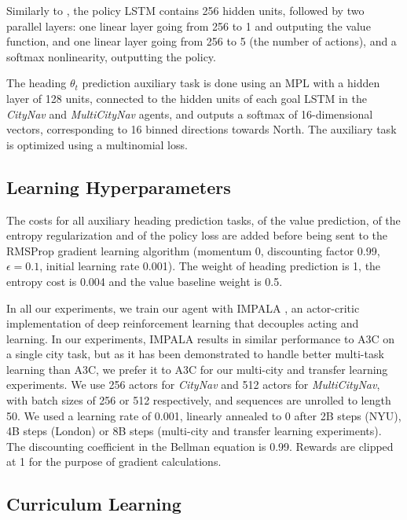 Similarly to \cite{mnih2016asynchronous}, the policy LSTM contains 256 hidden units, followed by two parallel layers: one linear layer going from 256 to 1 and outputing the value function, and one linear layer going from 256 to 5 (the number of actions), and a softmax nonlinearity, outputting the policy.

The heading $\theta_t$ prediction auxiliary task is done using an MPL with a hidden layer of 128 units, connected to the hidden units of each goal LSTM in the \emph{CityNav} and \emph{MultiCityNav} agents, and outputs a softmax of 16-dimensional vectors, corresponding to 16 binned directions towards North. The auxiliary task is optimized using a multinomial loss.

\subsection{Learning Hyperparameters}
\label{supp:hyperparameters}

The costs for all auxiliary heading prediction tasks, of the value prediction, of the entropy regularization and of the policy loss are added before being sent to the RMSProp gradient learning algorithm \cite{tieleman2012lecture} (momentum 0, discounting factor 0.99, $\epsilon=0.1$, initial learning rate 0.001). The weight of heading prediction is 1, the entropy cost is 0.004 and the value baseline weight is 0.5.

In all our experiments, we train our agent with IMPALA \cite{espeholt2018impala}, an actor-critic implementation of deep reinforcement learning that decouples acting and learning. In our experiments, IMPALA results in similar performance to A3C \cite{mnih2016asynchronous} on a single city task, but as it has been demonstrated to handle better multi-task learning than A3C, we prefer it to A3C for our multi-city and transfer learning experiments. We use 256 actors for \emph{CityNav} and 512 actors for \emph{MultiCityNav}, with batch sizes of 256 or 512 respectively, and sequences are unrolled to length 50. We used a learning rate of 0.001, linearly annealed to 0 after 2B steps (NYU), 4B steps (London) or 8B steps (multi-city and transfer learning experiments). The discounting coefficient in the Bellman equation is 0.99. Rewards are clipped at 1 for the purpose of gradient calculations.

\subsection{Curriculum Learning}
\label{supp:curriculum}

